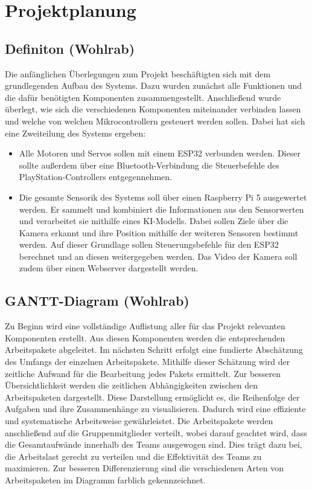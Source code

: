 \chapter{Projektplanung}

\section{Definiton (Wohlrab)}

Die anfänglichen Überlegungen zum Projekt beschäftigten sich mit dem grundlegenden Aufbau des Systems.
Dazu wurden zunächst alle Funktionen und die dafür benötigten Komponenten zusammengestellt.
Anschließend wurde überlegt, wie sich die verschiedenen Komponenten miteinander verbinden lassen und welche von welchen Mikrocontrollern gesteuert werden sollen.
Dabei hat sich eine Zweiteilung des Systems ergeben: 
\begin{itemize}
    \item Alle Motoren und Servos sollen mit einem ESP32 verbunden werden.
    Dieser sollte außerdem über eine Bluetooth-Verbindung die Steuerbefehle des PlayStation-Controllers entgegennehmen.
    \item Die gesamte Sensorik des Systems soll über einen Raspberry Pi 5 ausgewertet werden.
    Er sammelt und kombiniert die Informationen aus den Sensorwerten und verarbeitet sie mithilfe eines KI-Modells.
    Dabei sollen Ziele über die Kamera erkannt und ihre Position mithilfe der weiteren Sensoren bestimmt werden.
    Auf dieser Grundlage sollen Steuerungsbefehle für den ESP32 berechnet und an diesen weitergegeben werden.
    Das Video der Kamera soll zudem über einen Webserver dargestellt werden.
\end{itemize}

\section{GANTT-Diagram (Wohlrab)}

Zu Beginn wird eine vollständige Auflistung aller für das Projekt relevanten Komponenten erstellt. 
Aus diesen Komponenten werden die entsprechenden Arbeitspakete abgeleitet.
Im nächsten Schritt erfolgt eine fundierte Abschätzung des Umfangs der einzelnen Arbeitspakete. 
Mithilfe dieser Schätzung wird der zeitliche Aufwand für die Bearbeitung jedes Pakets ermittelt.
Zur besseren Übersichtlichkeit werden die zeitlichen Abhängigkeiten zwischen den Arbeitspaketen dargestellt. 
Diese Darstellung ermöglicht es, die Reihenfolge der Aufgaben und ihre Zusammenhänge zu visualisieren. 
Dadurch wird eine effiziente und systematische Arbeitsweise gewährleistet.
Die Arbeitspakete werden anschließend auf die Gruppenmitglieder verteilt, wobei darauf geachtet wird, dass die Gesamtaufwände innerhalb des Teams ausgewogen sind. 
Dies trägt dazu bei, die Arbeitslast gerecht zu verteilen und die Effektivität des Teams zu maximieren.
Zur besseren Differenzierung sind die verschiedenen Arten von Arbeitspaketen im Diagramm farblich gekennzeichnet.

